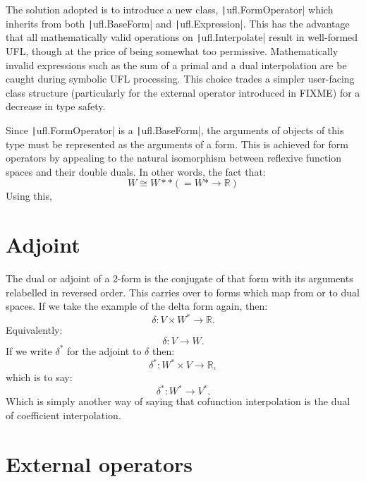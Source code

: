 \documentclass[a4paper,11pt]{article}
\begin{document}
The solution adopted is to introduce a new class,
\texttt|ufl.FormOperator| which inherits from both
\texttt|ufl.BaseForm| and \texttt|ufl.Expression|. This
has the advantage that all mathematically valid operations on
\texttt|ufl.Interpolate| result in well-formed UFL, though at the
price of being somewhat too permissive. Mathematically invalid expressions such
as the sum of a primal and a dual interpolation are be caught during symbolic
UFL processing. This choice trades a simpler user-facing class structure
(particularly for the external operator introduced in FIXME) for a decrease in
type safety.

Since \texttt|ufl.FormOperator| is a
\texttt|ufl.BaseForm|, the arguments of objects of this type must
be represented as the arguments of a form. This is achieved for form operators
by appealing to the natural isomorphism between reflexive function spaces and
their double duals. In other words, the fact that:
\begin{equation}
    W\cong W** (= W*\rightarrow\mathbb{R})
\end{equation}
Using this, 

\section{Adjoint}

The  dual or adjoint of a 2-form is the conjugate of that form with its
arguments relabelled in reversed order. This carries over to forms which map
from or to dual spaces. If we take the example of the delta form again, then:
\begin{equation}
    \delta: V \times W^* \rightarrow \mathbb{R}.
\end{equation}
Equivalently:
\begin{equation}
    \delta: V \rightarrow W.
\end{equation}
If we write $\delta^*$ for the adjoint to $\delta$ then:
\begin{equation}
    \delta^*: W^* \times V \rightarrow \mathbb{R},
\end{equation}
which is to say:
\begin{equation}
    \delta^*: W^* \rightarrow V^*.
\end{equation}
Which is simply another way of saying that cofunction interpolation is the dual of coefficient interpolation.

\section{External operators}
\end{document}
